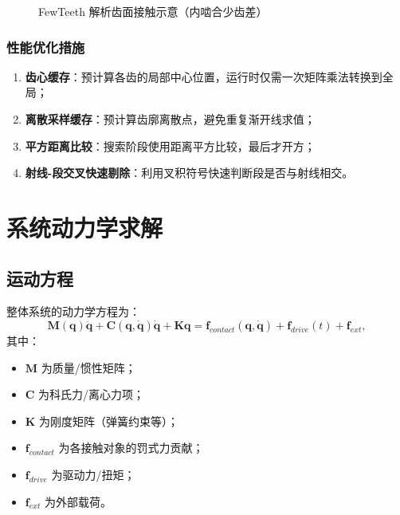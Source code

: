 \documentclass[12pt]{ctexart}
\begin{document}
\begin{figure}[htbp]
\centering
{}
\caption{FewTeeth 解析齿面接触示意（内啮合少齿差）}
\end{figure}

\subsubsection{性能优化措施}

\begin{enumerate}
  \item \textbf{齿心缓存}：预计算各齿的局部中心位置，运行时仅需一次矩阵乘法转换到全局；
  \item \textbf{离散采样缓存}：预计算齿廓离散点，避免重复渐开线求值；
  \item \textbf{平方距离比较}：搜索阶段使用距离平方比较，最后才开方；
  \item \textbf{射线-段交叉快速剔除}：利用叉积符号快速判断段是否与射线相交。
\end{enumerate}

\section{系统动力学求解}

\subsection{运动方程}

整体系统的动力学方程为：
\begin{equation}
\mathbf{M}(\mathbf{q})\ddot{\mathbf{q}} + \mathbf{C}(\mathbf{q}, \dot{\mathbf{q}})\dot{\mathbf{q}} + \mathbf{K}\mathbf{q} = \mathbf{f}_{contact}(\mathbf{q}, \dot{\mathbf{q}}) + \mathbf{f}_{drive}(t) + \mathbf{f}_{ext},
\end{equation}
其中：
\begin{itemize}
  \item $\mathbf{M}$ 为质量/惯性矩阵；
  \item $\mathbf{C}$ 为科氏力/离心力项；
  \item $\mathbf{K}$ 为刚度矩阵（弹簧约束等）；
  \item $\mathbf{f}_{contact}$ 为各接触对象的罚式力贡献；
  \item $\mathbf{f}_{drive}$ 为驱动力/扭矩；
  \item $\mathbf{f}_{ext}$ 为外部载荷。
\end{itemize}
\end{document}
